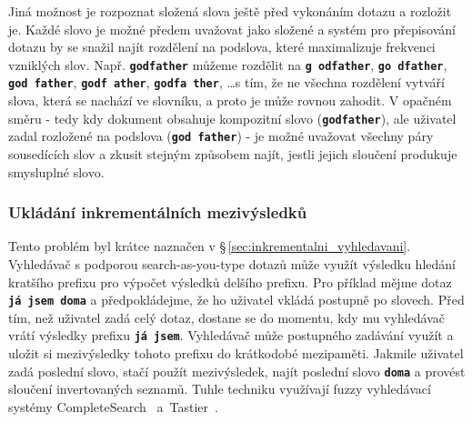 \documentclass[11pt,letterpaper,oneside,openright]{book}
\newcommand{\bftt}[1]{\texttt{\textbf{#1}}}
\begin{document}
Jiná možnost je rozpoznat složená slova ještě před vykonáním dotazu a rozložit
je. Každé slovo je možné předem uvažovat jako složené a systém pro přepisování
dotazu by se snažil najít rozdělení na podslova, které maximalizuje frekvenci
vzniklých slov. Např. \bftt{godfather} můžeme rozdělit na \bftt{g odfather},
\bftt{go dfather}, \bftt{god father}, \bftt{godf ather}, \bftt{godfa ther},
\ldots s tím, že ne všechna rozdělení vytváří slova, která se nachází ve
slovníku, a proto je může rovnou zahodit. V opačném směru - tedy kdy dokument
obsahuje kompozitní slovo (\bftt{godfather}), ale uživatel zadal rozložené na
podslova (\bftt{god father}) - je možné uvažovat všechny páry sousedících slov
a zkusit stejným způsobem najít, jestli jejich sloučení produkuje smysluplné
slovo.

\subsubsection{Ukládání inkrementálních mezivýsledků}
Tento problém byl krátce naznačen v \S\,\ref{sec:inkrementalni_vyhledavani}.
Vyhledávač s podporou search-as-you-type dotazů může využít výsledku hledání
kratšího prefixu pro výpočet výsledků delšího prefixu. Pro příklad mějme dotaz
\bftt{já jsem doma} a předpokládejme, že ho uživatel vkládá postupně po
slovech. Před tím, než uživatel zadá celý dotaz, dostane se do momentu, kdy mu
vyhledávač vrátí výsledky prefixu \bftt{já jsem}. Vyhledávač může postupného
zadávání využít a uložit si mezivýsledky tohoto prefixu do krátkodobé
mezipaměti. Jakmile uživatel zadá poslední slovo, stačí použít mezivýsledek,
najít poslední slovo \bftt{doma} a provést sloučení invertovaných seznamů.
Tuhle techniku využívají fuzzy vyhledávací systémy
CompleteSearch~\cite{Bast:2006:TLF:1148170.1148234}
a~Tastier~\cite{Ji:2009:EIF:1526709.1526760}.

\end{document}
